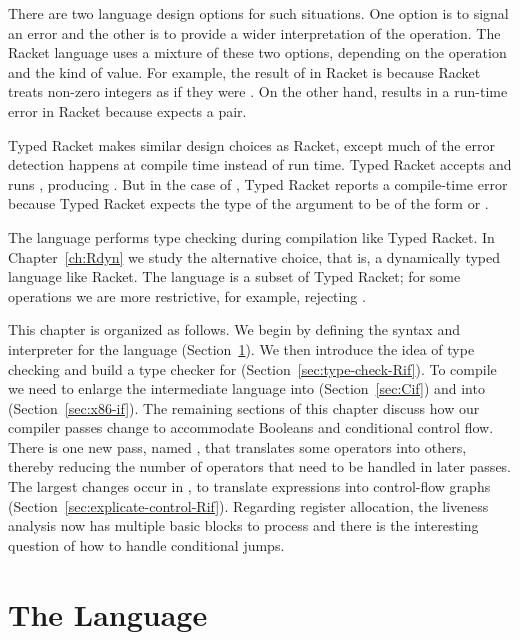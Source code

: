 \documentclass[11pt]{book}
\begin{document}
There are two language design options for such situations.  One option
is to signal an error and the other is to provide a wider
interpretation of the operation. The Racket language uses a mixture of
these two options, depending on the operation and the kind of
value. For example, the result of  in Racket is
 because Racket treats non-zero integers as if they were
. On the other hand,  results in a run-time
error in Racket because  expects a pair.

Typed Racket makes similar design choices as Racket, except much of
the error detection happens at compile time instead of run time. Typed
Racket accepts and runs , producing . But in
the case of , Typed Racket reports a compile-time error
because Typed Racket expects the type of the argument to be of the
form  or .

The \LangIf{} language performs type checking during compilation like
Typed Racket. In Chapter~\ref{ch:Rdyn} we study the
alternative choice, that is, a dynamically typed language like Racket.
The \LangIf{} language is a subset of Typed Racket; for some
operations we are more restrictive, for example, rejecting
.

This chapter is organized as follows.  We begin by defining the syntax
and interpreter for the \LangIf{} language
(Section~\ref{sec:lang-if}). We then introduce the idea of type
checking and build a type checker for \LangIf{}
(Section~\ref{sec:type-check-Rif}). To compile \LangIf{} we need to
enlarge the intermediate language \LangCVar{} into \LangCIf{}
(Section~\ref{sec:Cif}) and \LangXInt{} into \LangXIf{}
(Section~\ref{sec:x86-if}). The remaining sections of this chapter
discuss how our compiler passes change to accommodate Booleans and
conditional control flow. There is one new pass, named ,
that translates some operators into others, thereby reducing the
number of operators that need to be handled in later passes.  The
largest changes occur in , to translate
 expressions into control-flow graphs
(Section~\ref{sec:explicate-control-Rif}).  Regarding register
allocation, the liveness analysis now has multiple basic blocks to
process and there is the interesting question of how to handle
conditional jumps.


\section{The \LangIf{} Language}
\label{sec:lang-if}
\end{document}
